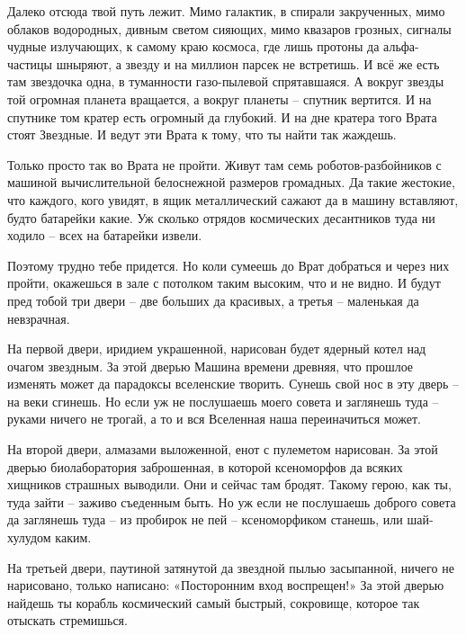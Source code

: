 \documentclass[ebook,oneside,final,openright]{memoir}
\begin{document}
\par
Далеко отсюда твой путь лежит. Мимо галактик, в спирали закрученных, мимо облаков водородных, дивным светом сияющих, мимо квазаров грозных, сигналы чудные излучающих, к самому краю космоса, где лишь протоны да альфа-частицы шныряют, а звезду и на миллион парсек не встретишь. И всё же есть там звездочка одна, в туманности газо-пылевой спрятавшаяся. А вокруг звезды той огромная планета вращается, а вокруг планеты – спутник вертится. И на спутнике том кратер есть огромный да глубокий. И на дне кратера того Врата стоят Звездные. И ведут эти Врата к тому, что ты найти так жаждешь.\par
\par
Только просто так во Врата не пройти. Живут там семь роботов-разбойников с машиной вычислительной белоснежной размеров громадных. Да такие жестокие, что каждого, кого увидят, в ящик металлический сажают да в машину вставляют, будто батарейки какие. Уж сколько отрядов космических десантников туда ни ходило – всех на батарейки извели.\par
\par
Поэтому трудно тебе придется. Но коли сумеешь до Врат добраться и через них пройти, окажешься в зале с потолком таким высоким, что и не видно. И будут пред тобой три двери – две больших да красивых, а третья – маленькая да невзрачная.\par
\par
На первой двери, иридием украшенной, нарисован будет ядерный котел над очагом звездным. За этой дверью Машина времени древняя, что прошлое изменять может да парадоксы вселенские творить. Сунешь свой нос в эту дверь – на веки сгинешь. Но если уж не послушаешь моего совета и заглянешь туда – руками ничего не трогай, а то и вся Вселенная наша переиначиться может.\par
\par
На второй двери, алмазами выложенной, енот с пулеметом нарисован. За этой дверью биолаборатория заброшенная, в которой ксеноморфов да всяких хищников страшных выводили. Они и сейчас там бродят. Такому герою, как ты, туда зайти – заживо съеденным быть. Но уж если не послушаешь доброго совета да заглянешь туда – из пробирок не пей – ксеноморфиком станешь, или шай-хулудом каким.\par
\par
На третьей двери, паутиной затянутой да звездной пылью засыпанной, ничего не нарисовано, только написано: «Посторонним вход воспрещен!» За этой дверью найдешь ты корабль космический самый быстрый, сокровище, которое так отыскать стремишься.\par
\end{document}
